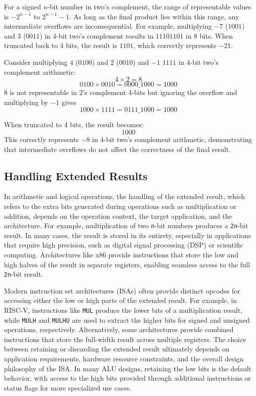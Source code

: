 For a signed \(n\)-bit number in two's complement, the range of representable values is \(-2^{n-1}\) to \(2^{n-1} - 1\). As long as the final product lies within this range, any intermediate overflows are inconsequential. For example, multiplying \(-7\) (\(1001\)) and \(3\) (\(0011\)) in 4-bit two's complement results in \(11101101\) in 8 bits. When truncated back to 4 bits, the result is \(1101\), which correctly represents \(-21\).

Consider multiplying \(4\) (\(0100\)) and \(2\) (\(0010\)) and \(-1\) \(1111\) in 4-bit two's complement arithmetic:
\[
4 \times 2 = 8
\]
\[
0100 \times 0010 = 0000\_1000 = 1000
\]
8 is not representable in 2's complement 4-bits but ignoring the overflow and multiplying by $-1$ gives
\[
1000 \times 1111 = 0111\_1000 = 1000
\]

When truncated to 4 bits, the result becomes:
\[
1000
\]
This correctly represents \(-8\) in 4-bit two's complement arithmetic, demonstrating that intermediate overflows do not affect the correctness of the final result.

\subsection{Handling Extended Results}

In arithmetic and logical operations, the handling of the extended result, which refers to the extra bits generated during operations such as multiplication or addition, depends on the operation context, the target application, and the architecture. For example, multiplication of two \texttt{n}-bit numbers produces a \texttt{2n}-bit result. In many cases, the result is stored in its entirety, especially in applications that require high precision, such as digital signal processing (DSP) or scientific computing. Architectures like x86 provide instructions that store the low and high halves of the result in separate registers, enabling seamless access to the full \texttt{2n}-bit result.

Modern instruction set architectures (ISAs) often provide distinct opcodes for accessing either the low or high parts of the extended result. For example, in RISC-V, instructions like \texttt{MUL} produce the lower bits of a multiplication result, while \texttt{MULH} and \texttt{MULHU} are used to extract the higher bits for signed and unsigned operations, respectively. Alternatively, some architectures provide combined instructions that store the full-width result across multiple registers. The choice between retaining or discarding the extended result ultimately depends on application requirements, hardware resource constraints, and the overall design philosophy of the ISA. In many ALU designs, retaining the low bits is the default behavior, with access to the high bits provided through additional instructions or status flags for more specialized use cases.


